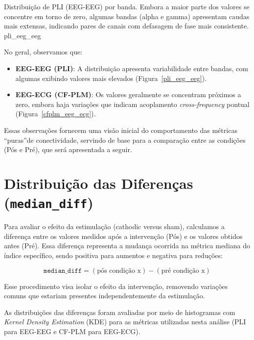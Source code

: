 {Distribuição de PLI (EEG-EEG) por banda. Embora a maior parte dos valores se concentre em torno de zero, algumas bandas (alpha e gamma) apresentam caudas mais extensas, indicando pares de canais com defasagem de fase mais consistente.}
{pli_eeg_eeg}

No geral, observamos que:
\begin{itemize}
    \item \textbf{EEG-EEG (PLI)}: A distribuição apresenta variabilidade entre bandas, com algumas exibindo valores mais elevados (Figura~\ref{pli_eeg_eeg}).
    \item \textbf{EEG-ECG (CF-PLM)}: Os valores geralmente se concentram próximos a zero, embora haja variações que indicam acoplamento \emph{cross-frequency} pontual (Figura~\ref{cfplm_eeg_ecg}).
\end{itemize}

Essas observações fornecem uma visão inicial do comportamento das métricas \textquotedblleft puras\textquotedblright de conectividade, servindo de base para a comparação entre as condições (Pós e Pré), que será apresentada a seguir.

\section{Distribuição das Diferenças (\texttt{median\_diff})}

Para avaliar o efeito da estimulação (cathodic versus sham), calculamos a diferença entre os valores medidos após a intervenção (Pós) e os valores obtidos antes (Pré). Essa diferença representa a mudança ocorrida na métrica mediana do índice específico, sendo positiva para aumentos e negativa para reduções:

\[
\texttt{median\_diff} = (\text{pós condição x}) - (\text{pré condição x})
\]

Esse procedimento visa isolar o efeito da intervenção, removendo variações comuns que estariam presentes independentemente da estimulação.

As distribuições das diferenças foram avaliadas por meio de histogramas com \emph{Kernel Density Estimation} (KDE) para as métricas utilizadas nesta análise (PLI para EEG-EEG e CF-PLM para EEG-ECG).

